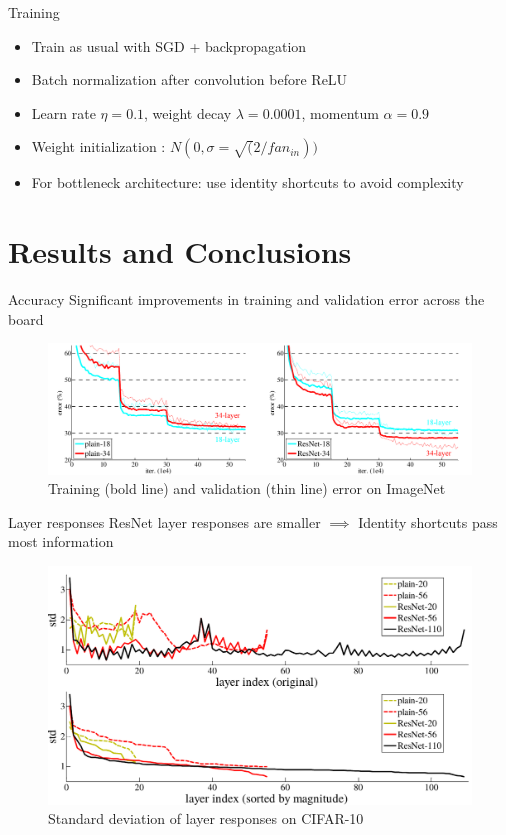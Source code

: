 \documentclass[10pt]{beamer}
\begin{document}
	\begin{frame}{Training}
		\begin{itemize}
			\item Train as usual with SGD + backpropagation
			\item Batch normalization after convolution before ReLU
			\item Learn rate $\eta=0.1$, weight decay $\lambda = 0.0001$, momentum $\alpha=0.9$
			\item Weight initialization \cite{delving_deeper_he2015}: $N(0, \sigma=\sqrt(2/fan_{in}))$
			\item For bottleneck architecture: use identity shortcuts to avoid complexity 
		\end{itemize}
	\end{frame}

\section{Results and Conclusions}
	\begin{frame}{Accuracy}
		Significant improvements in training and validation error across the board
		\begin{figure}
			\centering
			\includegraphics[width=\textwidth]{results-imagenet-1.png}
			\caption{Training (bold line) and validation (thin line) error on ImageNet}
			\label{fig_results_imagenet}
		\end{figure}
	\end{frame}

	\begin{frame}{Layer responses}
		ResNet layer responses are smaller $\implies$ Identity shortcuts pass most information 
		\begin{figure}
			\centering
			\includegraphics[width=\textwidth]{layer-response.png}
			\caption{Standard deviation of layer responses on CIFAR-10}
			\label{fig_layer_response}
		\end{figure}		
	\end{frame}
\end{document}
